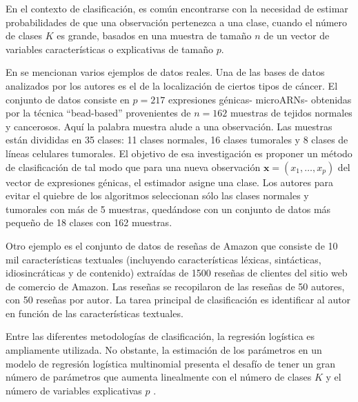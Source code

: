 \documentclass{report}
\begin{document}
En el contexto de clasificación, es común encontrarse con la necesidad de estimar probabilidades de que una observación pertenezca a una clase, cuando el número de clases $K$ es grande, basados en una muestra de tamaño $n$ de un vector de variables  características o explicativas de tamaño $p$. 

En \cite{vincent2014} se mencionan varios ejemplos de datos reales.   Una de las bases de datos analizados por los autores es el de la localización de ciertos tipos de cáncer. El conjunto de datos consiste en $p=217$ expresiones génicas- microARNs- obtenidas por la técnica ``bead-based'' provenientes de $n=162$ muestras de tejidos normales y cancerosos.  Aquí la palabra muestra alude a una observación. Las muestras están divididas en 35 clases: 11 clases normales, 16 clases tumorales y 8 clases de líneas celulares tumorales.   El objetivo de esa investigación es proponer un método de clasificación de tal modo que para una nueva observación $\mathbf{x}=(x_1, \ldots, x_{p})$ del vector de expresiones génicas, el estimador asigne una clase.    Los autores para evitar el quiebre de los algoritmos seleccionan sólo las clases normales y tumorales con más de 5 muestras, quedándose con un conjunto de datos más pequeño de 18 clases con 162 muestras. 



Otro ejemplo es el  conjunto de datos de reseñas de Amazon que consiste de   10 mil características textuales (incluyendo características léxicas, sintácticas, idiosincráticas y de contenido) extraídas de 1500 reseñas de clientes del sitio web de comercio de Amazon. Las reseñas se recopilaron de  las reseñas de 50 autores, con 50 reseñas por autor. La tarea principal de clasificación es identificar al autor en función de las características textuales.




Entre las diferentes metodologías de clasificación, la regresión logística es ampliamente utilizada. No obstante, la estimación de los parámetros en un modelo de regresión logística multinomial presenta el desafío de tener un gran número de parámetros que aumenta linealmente con el número de clases $K$ y el número de variables explicativas $p$ \citep{nibbering2022}.  
\end{document}
